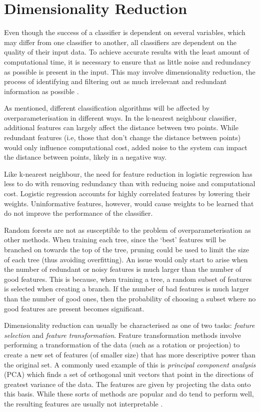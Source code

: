 		
\section{Dimensionality Reduction}
\label{sec:dimensionalityReduction}

Even though the success of a classifier is dependent on several variables, which may differ from one classifier to another, all classifiers are dependent on the quality of their input data. To achieve accurate results with the least amount of computational time, it is necessary to ensure that as little noise and redundancy as possible is present in the input. This may involve dimensionality reduction, the process of identifying and filtering out as much irrelevant and redundant information as possible \cite{Hall}. 

As mentioned, different classification algorithms will be affected by overparameterisation in different ways. In the k-nearest neighbour classifier, additional features can largely affect the distance between two points. While redundant features (i.e, those that don't change the distance between points) would only influence computational cost, added noise to the system can impact the distance between points, likely in a negative way. 

Like k-nearest neighbour, the need for feature reduction in logistic regression has less to do with removing redundancy than with reducing noise and computational cost. Logistic regression accounts for highly correlated features by lowering their weights. Uninformative features, however, would cause weights to be learned that do not improve the performance of the classifier. 

Random forests are not as susceptible to the problem of overparameterisation as other methods. When training each tree, since the `best' features will be branched on towards the top of the tree, pruning could be used to limit the size of each tree (thus avoiding overfitting). An issue would only start to arise when the number of redundant or noisy features is much larger than the number of good features. This is because, when training a tree, a random subset of features is selected when creating a branch. If the number of bad features is much larger than the number of good ones, then the probability of choosing a subset where no good features are present becomes significant.

Dimensionality reduction can usually be characterised as one of two tasks: \textit{feature selection} and \textit{feature transformation}. Feature transformation methods involve performing a transformation of the data (such as a rotation or projection) to create a new set of features (of smaller size) that has more descriptive power than the original set. A commonly used example of this is \textit{principal component analysis} (PCA) which finds a set of orthogonal unit vectors that point in the directions of greatest variance of the data. The features are given by projecting the data onto this basis. While these sorts of methods are popular and do tend to perform well, the resulting features are usually not interpretable \cite{Guyon}. 

